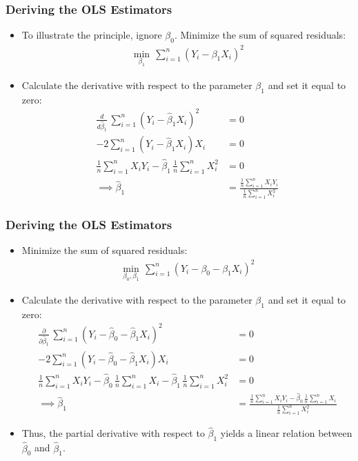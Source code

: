 

\begin{frame}
\frametitle{Deriving the OLS Estimators}
\begin{itemize}
\item To illustrate the principle, ignore $\beta_{0}$. Minimize the sum of squared residuals:
\begin{align*}
\min_{\beta_{1}}\, 
\sum_{i=1}^{n}(Y_{i}-\beta_{1}X_{i})^{2}
\end{align*}
\item Calculate the derivative with respect to the parameter $\beta_{1}$ and set it equal to zero:
\begin{align*}
\frac{d}{d\hat{\beta}_{1}}\,
\sum_{i=1}^{n}(Y_{i}-\hat{\beta}_{1}X_{i})^{2}
  & = 0\\
  -2\sum_{i=1}^{n}(Y_{i}-\hat{\beta}_{1}X_{i})X_{i} 
  & = 0\\
  \frac{1}{n}\sum_{i=1}^{n}X_{i}Y_{i}
  -\hat{\beta}_{1}\,\frac{1}{n}\sum_{i=1}^{n}X_{i}^{2} & = 0\\
\implies
  \hat{\beta}_{1}
  & = \frac{\frac{1}{n}\sum_{i=1}^{n}X_{i}Y_{i}}{\frac{1}{n}\sum_{i=1}^{n}X_{i}^{2}}
\end{align*}
\end{itemize}
\end{frame}


\begin{frame}
\frametitle{Deriving the OLS Estimators}
\begin{itemize}
\item Minimize the sum of squared residuals:
\begin{align*}
\min_{\beta_{0},\beta_{1}}\, 
\sum_{i=1}^{n}(Y_{i}-\beta_{0}-\beta_{1}X_{i})^{2}
\end{align*}
\item Calculate the derivative with respect to the parameter $\beta_{1}$ and set it equal to zero:
\begin{align*}
\frac{\partial}{\partial\hat{\beta}_{1}}\,
\sum_{i=1}^{n}(Y_{i}-\hat{\beta}_{0}-\hat{\beta}_{1}X_{i})^{2}
  & = 0\\
  -2 \sum_{i=1}^{n}(Y_{i}-\hat{\beta}_{0}-\hat{\beta}_{1}X_{i})X_{i} 
  & = 0\\
  \frac{1}{n}\sum_{i=1}^{n}X_{i}Y_{i}
  -\hat{\beta}_{0}\,\frac{1}{n}\sum_{i=1}^{n}X_{i}
  -\hat{\beta}_{1}\,\frac{1}{n}\sum_{i=1}^{n}X_{i}^{2} & = 0\\
\implies
  \hat{\beta}_{1}
  & = \frac{\frac{1}{n}\sum_{i=1}^{n}X_{i}Y_{i}-\hat{\beta}_{0}\,\frac{1}{n}\sum_{i=1}^{n}X_{i}}{\frac{1}{n}\sum_{i=1}^{n}X_{i}^{2}}
\end{align*}
\item Thus, the partial derivative with respect to $\hat{\beta}_{1}$ yields a linear relation between $\hat{\beta}_{0}$ and $\hat{\beta}_{1}$. 
\end{itemize}
\end{frame}


